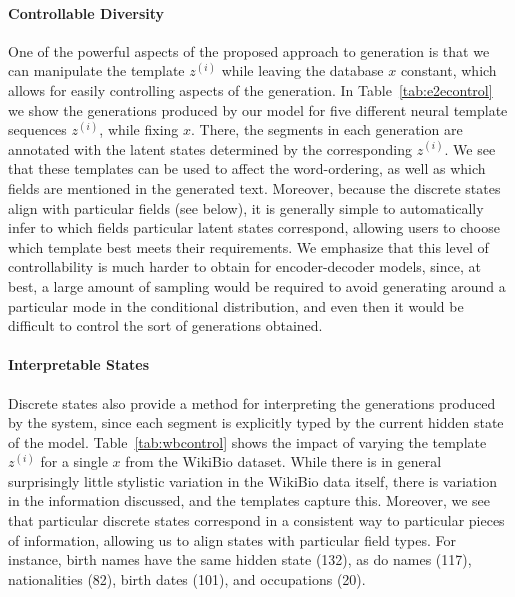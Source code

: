\documentclass[11pt,a4paper]{article}
\begin{document}
\paragraph{Controllable Diversity}
One of the powerful aspects of the proposed approach to generation is that we can manipulate the template $z^{(i)}$ while leaving the database $x$ constant, which allows for easily controlling aspects of the generation. In Table~\ref{tab:e2econtrol}  we show the generations produced by our model for five different neural template sequences $z^{(i)}$, while fixing $x$. There, the segments in each generation are annotated with the latent states determined by the corresponding $z^{(i)}$. We see that these templates can be used to affect the word-ordering, as well as which fields are mentioned in the generated text. Moreover, because the discrete states align with particular fields (see below), it is generally simple to automatically infer to which fields particular latent states correspond, allowing users to choose which template best meets their requirements. We emphasize that this level of controllability is much harder to obtain for encoder-decoder models, since, at best, a large amount of sampling would be required to avoid generating around a particular mode in the conditional distribution, and even then it would be difficult to control the sort of generations obtained. %


\paragraph{Interpretable States}
Discrete states also provide a method for interpreting the generations produced by the system, since each segment is explicitly typed by the current 
hidden state of the model. Table~\ref{tab:wbcontrol} shows the impact of varying the template $z^{(i)}$ for a single $x$ from the WikiBio dataset. While there is in general surprisingly little stylistic variation in the WikiBio data itself, there is variation in the information discussed, and the templates capture this. Moreover, we see that particular discrete states correspond in a consistent way to particular pieces of information, allowing us to align states with particular field types. For instance, birth names have the same hidden state (132), as do names (117), nationalities (82), birth dates (101), and occupations (20). 
\end{document}
